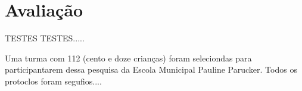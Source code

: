\chapter{Avaliação}\label{ch:Avaliacao}

TESTES TESTES.....

Uma turma com 112 (cento e doze crianças) foram seleciondas para participantarem dessa pesquisa da Escola Municipal Pauline Parucker. Todos os protoclos foram segufios....